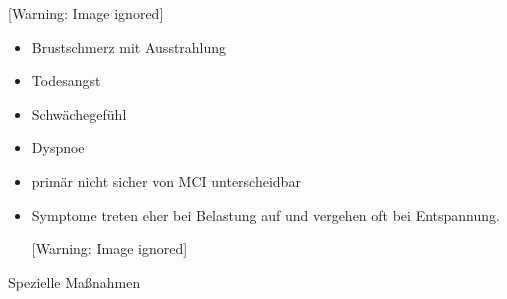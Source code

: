 \documentclass{article}
\makeatletter
\newcommand\captionof[1]{\def\@captype{#1}\caption}
\makeatother
\begin{document}
\begin{center}
 [Warning: Image ignored] %
\captionof{figure}[Patient mit einem akuten Koronarsyndrom, vermutlich
Angina Pectoris. Bei kaltem Wetter, beim Stiegen steigen mit schwerem
Gep\"ack: Ein pl\"otzliches Engegef\"uhl im Brustkorb und ein
stechender Schmerz im linken Thorax.]{Patient mit einem akuten
Koronarsyndrom, vermutlich Angina Pectoris. Bei kaltem Wetter, beim
Stiegen steigen mit schwerem Gep\"ack: Ein pl\"otzliches Engegef\"uhl
im Brustkorb und ein stechender Schmerz im linken Thorax.}

\end{center}
\begin{itemize}
\item Brustschmerz mit Ausstrahlung

\item Todesangst

\item Schw\"achegef\"uhl

\item Dyspnoe

\item prim\"ar nicht sicher von MCI unterscheidbar 

\item Symptome treten eher bei Belastung auf und vergehen oft bei
Entspannung. 

\begin{center}
 [Warning: Image ignored] %
\captionof{figure}[Schmerzausdehnung beim isch\"amischen
Herzschmerz.]{Schmerzausdehnung beim isch\"amischen Herzschmerz.}

\end{center}
\end{itemize}
Spezielle Ma{\ss}nahmen
\end{document}
